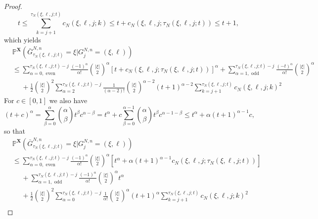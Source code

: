 \documentclass[a4paper,11pt]{article}
\theoremstyle{definition}
\newcommand{\bbP}{\mathbb{P}}
\newcommand{\bfX}{\mathbf{X}}
\begin{document}
\begin{proof}
\begin{equation}
t \leq \sum_{ k = j + 1 }^{ \tau_N( \xi, \ell, j; t ) } c_N( \xi, \ell, j; k ) \leq t + c_N( \xi, \ell, j; \tau_N( \xi, \ell, j; t ) ) \leq t + 1,
\end{equation}
which yields
\begin{align*}
&\bbP^{ \bfX }(  \bar{ G }_{ \tau_N( \xi, \ell, j; t ) }^{ N, n } = \xi | G_j^{ N, n } = ( \xi, \ell ) ) \\
&\leq \sum_{ \alpha = 0, \text{ even} }^{ \tau_N( \xi, \ell, j; t ) - j } \frac{ ( -1 )^{ \alpha } }{ \alpha ! } \binom{ | \xi | }{ 2 }^{ \alpha } [ t + c_N( \xi, \ell, j; \tau_N( \xi, \ell, j; t ) ) ]^{ \alpha } + \sum_{ \alpha = 1, \text{ odd} }^{ \tau_N( \xi, \ell, j; t ) - j } \frac{ ( -t )^{ \alpha } }{ \alpha ! } \binom{ | \xi | }{ 2 }^{ \alpha } \\
&\phantom{\leq} + \frac{ 1 }{ 2 } \binom{ | \xi | }{ 2 }^2 \sum_{ \alpha = 2 }^{ \tau_N( \xi, \ell, j; t ) - j } \frac{ 1 }{ ( \alpha - 2 ) ! } \binom{ | \xi | }{ 2 }^{ \alpha - 2 } ( t + 1 )^{ \alpha - 2 } \sum_{ k = j + 1 }^{ \tau_N( \xi, \ell, j; t ) } c_N( \xi, \ell, j; k )^2
\end{align*}
For $c \in [0, 1]$ we also have
\begin{equation}\label{elementary_binomial_bound}
( t + c )^{ \alpha } = \sum_{ \beta = 0 }^{ \alpha } \binom{ \alpha }{ \beta } t^{ \beta } c^{ \alpha - \beta } = t^{ \alpha } + c \sum_{ \beta = 0 }^{ \alpha - 1 } \binom{ \alpha }{ \beta } t^{ \beta } c^{ \alpha - 1 - \beta } \leq t^{ \alpha } + \alpha ( t + 1 )^{ \alpha - 1 } c,
\end{equation}
so that
\begin{align*}
&\bbP^{ \bfX }(  \bar{ G }_{ \tau_N( \xi, \ell, j; t ) }^{ N, n } = \xi | G_j^{ N, n } = ( \xi, \ell ) ) \\
&\leq \sum_{ \alpha = 0, \text{ even} }^{ \tau_N( \xi, \ell, j; t ) - j } \frac{ ( -1 )^{ \alpha } }{ \alpha ! } \binom{ | \xi | }{ 2 }^{ \alpha } [ t^{ \alpha } + \alpha ( t + 1 )^{ \alpha - 1 } c_N( \xi, \ell, j; \tau_N( \xi, \ell, j; t ) ) ] \\
&\phantom{\leq} + \sum_{ \alpha = 1, \text{ odd} }^{ \tau_N( \xi, \ell, j; t ) - j } \frac{ ( -1 )^{ \alpha } }{ \alpha ! } \binom{ | \xi | }{ 2 }^{ \alpha } t^{ \alpha } \\
&\phantom{\leq} + \frac{ 1 }{ 2 } \binom{ | \xi | }{ 2 }^2 \sum_{ \alpha = 0 }^{ \tau_N( \xi, \ell, j; t ) - j } \frac{ 1 }{ \alpha ! } \binom{ | \xi | }{ 2 }^{ \alpha } ( t + 1 )^{ \alpha } \sum_{ k = j + 1 }^{ \tau_N( \xi, \ell, j; t ) } c_N( \xi, \ell, j; k )^2 \\

\end{align*}
\end{proof}
\end{document}
